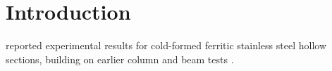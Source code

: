 \chapter{Introduction}

\textcite{afshan2013} reported experimental results for cold-formed ferritic
stainless steel hollow sections, building on earlier column and beam tests
\parencite{gardner2004}.
